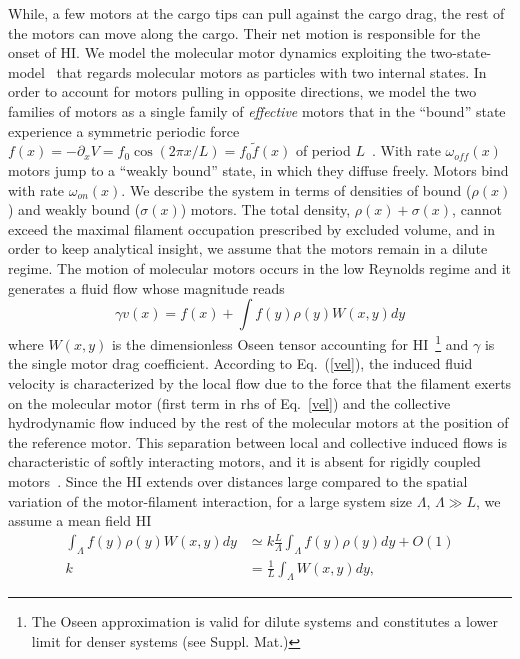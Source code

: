 \documentclass[prl,aps,twocolumn, floatfix, superscriptaddress,showpacs]{revtex4}
\newcommand{\tb}{\textcolor{blue}}
\begin{document}
While, a few motors at the cargo tips can  pull against the cargo drag, the rest of the motors can move along the cargo. Their net motion is responsible for the onset of HI. %
We model the molecular motor  dynamics exploiting the two-state-model~\cite{Julicher1995} that regards molecular motors as particles with two internal states. 
In order to account for motors pulling in opposite directions, we model the two families of motors as a single family of \textit{effective} motors that in the ``bound'' state experience a symmetric periodic force $f(x)=-\partial_x V=f_0\cos (2\pi x/L)=f_0\tilde{f}(x)$ of period $L$~\cite{Guerin2011}. With rate $\omega_{off}(x)$ motors  jump to a ``weakly bound'' state, in which they diffuse freely. Motors bind with rate $\omega_{on}(x)$.
We describe the system in terms of  densities of bound ($\rho(x)$) and weakly bound ($\sigma(x)$) motors. The total density, $\rho(x)+\sigma(x)$, cannot exceed the maximal  filament occupation prescribed by excluded volume, and in order to keep analytical insight, we    assume that the motors  remain in a  dilute regime. The motion of molecular motors occurs in the low Reynolds regime and it generates a fluid flow whose magnitude reads
\begin{equation}
\gamma v(x)= f(x) +\int f(y)\rho(y)W(x,y)dy 
\label{vel} 
\end{equation}
where $W(x,y)$ is the dimensionless Oseen tensor accounting for HI~\footnote{The Oseen  approximation is valid for  dilute systems and constitutes a lower limit for  denser systems (see Suppl. Mat.)} and $\gamma$ is the single motor drag coefficient. According to Eq.~(\ref{vel}),  the induced fluid velocity is characterized by the local flow due to the force that the filament exerts on the molecular motor (first term  in rhs of Eq.~\ref{vel}) and the collective hydrodynamic flow induced by the rest of the molecular motors at the position of the reference motor. This separation between local and collective induced flows is characteristic of softly interacting motors, and it is absent for rigidly coupled motors~\cite{Guerin2011}. Since the HI extends over distances large compared  to the spatial variation of the motor-filament interaction, for a large system size $\Lambda$, $\Lambda \gg L$, we assume a mean field HI
\begin{equation}
\begin{aligned}
 \int_\Lambda f(y)\rho(y)W(x,y)dy & \simeq  k\frac{L}{\Lambda}\int_{\Lambda} f(y)\rho(y)dy+O(1)\\
k & =  \frac{1}{L}\int_{\Lambda} W(x,y)dy,
\label{vel-approx}
\end{aligned}
\end{equation}
\end{document}
